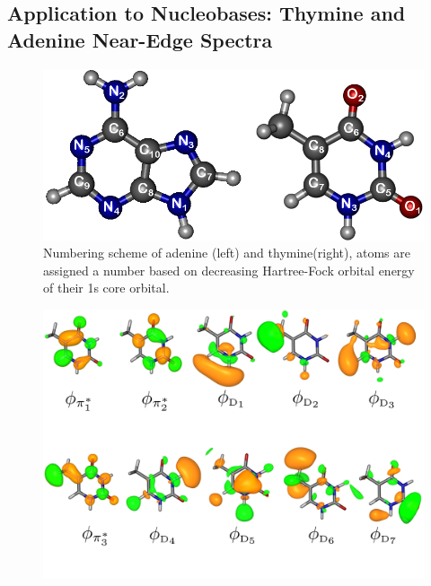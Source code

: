 \documentclass[12pt]{article}
\begin{document}
\subsection{Application to Nucleobases: Thymine and Adenine Near-Edge Spectra}
\begin{figure}[!ht]
\centering
\includegraphics[scale=0.45]{adenineThymineNumbering3D.png}
\caption{Numbering scheme of adenine (left) and thymine(right), atoms are assigned a number based on decreasing Hartree-Fock orbital energy of their 1s core orbital. }
\end{figure}
\begin{figure}
\centering
\includegraphics[scale =0.5]{ThymineVirtuals.png}
\end{figure}
\end{document}
